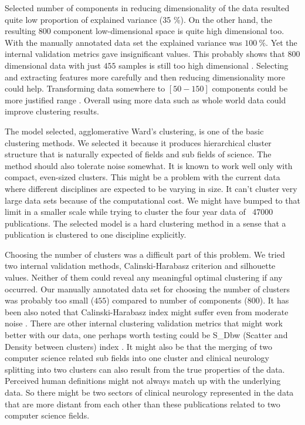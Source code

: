 Selected number of components in reducing dimensionality of the 
data resulted quite low proportion of explained variance (35 \%).
On the other hand, the resulting $800$ component low-dimensional
space is quite high dimensional too.
With the manually annotated data set the explained variance was 
$100\ \%$. Yet the internal validation metrics gave insignificant 
values. This probably shows that $800$ dimensional data with just 
$455$ samples is still too high dimensional \cite{aggarwal_surprising_2001}. 
Selecting and extracting features more carefully and then reducing
dimensionality more could help. Transforming data somewhere to 
$[50-150]$ components could be more justified range 
\cite{dolnicar_review_2002}. Overall using more data such as whole
world data could improve clustering results.

The model selected, agglomerative Ward's clustering, is one of the
basic clustering methods. We selected it because it produces 
hierarchical cluster structure that is naturally expected of fields
and sub fields of science. The method should also tolerate noise 
somewhat.
It is known to work well only with compact, even-sized clusters.
This might be a problem with the current data where different 
disciplines are expected to be varying in size.
It can't cluster very large data sets because of the computational
cost. We might have bumped to that limit in a smaller scale while 
trying to cluster the four year data of ~47000 publications.
The selected model is a hard clustering method in a sense that a
publication is clustered to one discipline explicitly.


Choosing the number of clusters was a difficult part of this 
problem. We tried two internal validation methods,
Calinski-Harabasz criterion and silhouette values. Neither of them
could reveal any meaningful optimal clustering if any occurred.
Our manually annotated data set for choosing the number of clusters
was probably too small ($455$) compared to number of components 
($800$). 
It has been also noted that Calinski-Harabasz index 
might suffer even from moderate noise \cite{liu_understanding_2010}.
There are other internal clustering validation metrics that might 
work better with our data, one perhaps worth testing could be
S\_Dbw (Scatter and Density between clusters) index 
\cite{halkidi_clustering_2001}. 
It might also be that the merging of two computer science related 
sub fields into one cluster and clinical neurology splitting into 
two clusters can also result from the true properties of the data.
Perceived human definitions might not always match up with the 
underlying data. So there might be two sectors of clinical 
neurology represented in the data that are more distant from each 
other than these publications related to two computer science fields.

